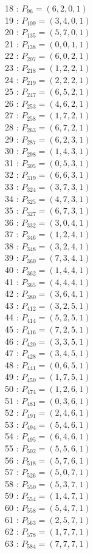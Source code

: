 \documentclass{article}
\begin{document}
{\begin{multicols}{2}
18 : $P_{96}=( 6, 2, 0, 1 )$\\
19 : $P_{109}=( 3, 4, 0, 1 )$\\
20 : $P_{135}=( 5, 7, 0, 1 )$\\
21 : $P_{138}=( 0, 0, 1, 1 )$\\
22 : $P_{207}=( 6, 0, 2, 1 )$\\
23 : $P_{218}=( 1, 2, 2, 1 )$\\
24 : $P_{219}=( 2, 2, 2, 1 )$\\
25 : $P_{247}=( 6, 5, 2, 1 )$\\
26 : $P_{253}=( 4, 6, 2, 1 )$\\
27 : $P_{258}=( 1, 7, 2, 1 )$\\
28 : $P_{263}=( 6, 7, 2, 1 )$\\
29 : $P_{287}=( 6, 2, 3, 1 )$\\
30 : $P_{298}=( 1, 4, 3, 1 )$\\
31 : $P_{305}=( 0, 5, 3, 1 )$\\
32 : $P_{319}=( 6, 6, 3, 1 )$\\
33 : $P_{324}=( 3, 7, 3, 1 )$\\
34 : $P_{325}=( 4, 7, 3, 1 )$\\
35 : $P_{327}=( 6, 7, 3, 1 )$\\
36 : $P_{332}=( 3, 0, 4, 1 )$\\
37 : $P_{346}=( 1, 2, 4, 1 )$\\
38 : $P_{348}=( 3, 2, 4, 1 )$\\
39 : $P_{360}=( 7, 3, 4, 1 )$\\
40 : $P_{362}=( 1, 4, 4, 1 )$\\
41 : $P_{365}=( 4, 4, 4, 1 )$\\
42 : $P_{380}=( 3, 6, 4, 1 )$\\
43 : $P_{412}=( 3, 2, 5, 1 )$\\
44 : $P_{414}=( 5, 2, 5, 1 )$\\
45 : $P_{416}=( 7, 2, 5, 1 )$\\
46 : $P_{420}=( 3, 3, 5, 1 )$\\
47 : $P_{428}=( 3, 4, 5, 1 )$\\
48 : $P_{441}=( 0, 6, 5, 1 )$\\
49 : $P_{450}=( 1, 7, 5, 1 )$\\
50 : $P_{474}=( 1, 2, 6, 1 )$\\
51 : $P_{481}=( 0, 3, 6, 1 )$\\
52 : $P_{491}=( 2, 4, 6, 1 )$\\
53 : $P_{494}=( 5, 4, 6, 1 )$\\
54 : $P_{495}=( 6, 4, 6, 1 )$\\
55 : $P_{502}=( 5, 5, 6, 1 )$\\
56 : $P_{518}=( 5, 7, 6, 1 )$\\
57 : $P_{526}=( 5, 0, 7, 1 )$\\
58 : $P_{550}=( 5, 3, 7, 1 )$\\
59 : $P_{554}=( 1, 4, 7, 1 )$\\
60 : $P_{558}=( 5, 4, 7, 1 )$\\
61 : $P_{563}=( 2, 5, 7, 1 )$\\
62 : $P_{578}=( 1, 7, 7, 1 )$\\
63 : $P_{584}=( 7, 7, 7, 1 )$\\
\end{multicols}
}
\end{document}
